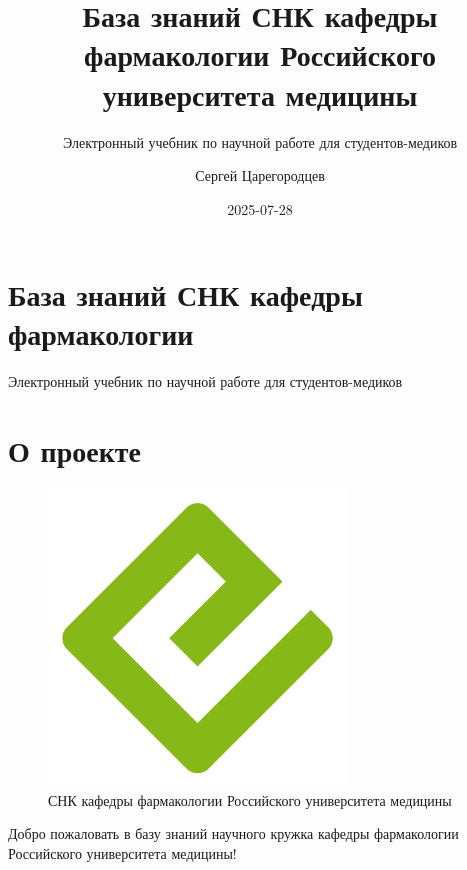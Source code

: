 \documentclass[
  russian,
  12pt,
  a4paper,
]{article}
\title{База знаний СНК кафедры фармакологии Российского университета
медицины}
\subtitle{Электронный учебник по научной работе для студентов-медиков}
\author{Сергей Царегородцев}
\date{2025-07-28}
\renewcommand*\contentsname{Содержание}
\newcommand\contentsname{Содержание}
\begin{document}
\maketitle

\renewcommand*\contentsname{Содержание}
{
\hypersetup{linkcolor=}
\setcounter{tocdepth}{2}
\tableofcontents
}


\chapter{База знаний СНК кафедры
фармакологии}\label{ux431ux430ux437ux430-ux437ux43dux430ux43dux438ux439-ux441ux43dux43a-ux43aux430ux444ux435ux434ux440ux44b-ux444ux430ux440ux43cux430ux43aux43eux43bux43eux433ux438ux438}

Электронный учебник по научной работе для студентов-медиков

\hfill\break


\chapter{О проекте}\label{sec-about}

\begin{figure}[H]

{\centering \includegraphics[width=3.125in,height=\textheight,keepaspectratio]{cover.png}

}

\caption{СНК кафедры фармакологии Российского университета медицины}

\end{figure}%

Добро пожаловать в базу знаний научного кружка кафедры фармакологии
Российского университета медицины!
\end{document}
